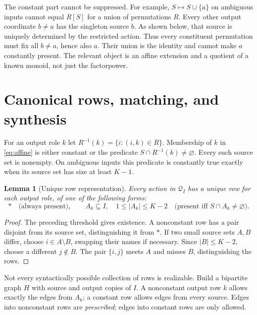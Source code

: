 \documentclass[11pt]{article}
\newtheorem{lemma}[theorem]{Lemma}
\begin{document}
The constant part cannot be suppressed. For example,
$S\mapsto S\cup\{a\}$ on ambiguous inputs cannot equal $R[S]$ for a
union of permutations $R$. Every other output coordinate $b\ne a$ has
the singleton source $b$. As shown below, that source is uniquely
determined by the restricted action. Thus every constituent permutation
must fix all $b\ne a$, hence also $a$. Their union is the identity and
cannot make $a$ constantly present. The relevant object is an affine
extension and a quotient of a known monoid, not just the factorpower.

\section{Canonical rows, matching, and synthesis}

For an output role $k$ let
$R^{-1}(k)=\{i:(i,k)\in R\}$. Membership of $k$ in
\eqref{eq:affine} is either constant or the predicate
$S\cap R^{-1}(k)\ne\varnothing$. Every such source set is nonempty.
On ambiguous inputs this predicate is constantly true exactly when its
source set has size at least $K-1$.

\begin{lemma}[Unique row representation]\label{lem:rows}
Every action in $\mathcal Q_I$ has a unique row for each output role,
of one of the following forms:
\[
 *\quad\text{(always present)},\qquad
 A_k\subseteq I,\quad 1\leq|A_k|\leq K-2
 \quad\text{(present iff }S\cap A_k\ne\varnothing\text{)}.
\]
\end{lemma}
\begin{proof}
The preceding threshold gives existence. A nonconstant row has a pair
disjoint from its source set, distinguishing it from $*$. If two small
source sets $A,B$ differ, choose $i\in A\setminus B$, swapping their
names if necessary. Since $|B|\leq K-2$, choose a different
$j\notin B$. The pair $\{i,j\}$ meets $A$ and misses $B$, distinguishing
the rows.
\end{proof}

Not every syntactically possible collection of rows is realizable. Build
a bipartite graph $H$ with source and output copies of $I$. A nonconstant
output row $k$ allows exactly the edges from $A_k$; a constant row allows
edges from every source. Edges into nonconstant rows are
\emph{prescribed}; edges into constant rows are only allowed.
\end{document}
